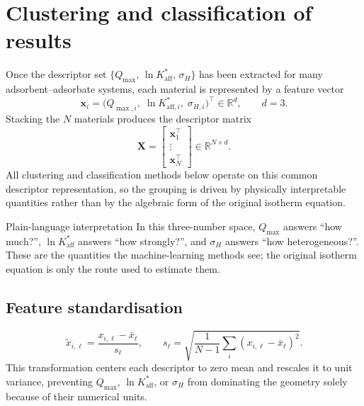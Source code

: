 \documentclass[journal=jacsat,manuscript=article]{achemso}
\begin{document}
\section{Clustering and classification of results}
\label{sec:si_clustering}

Once the descriptor set
$\{Q_{\max},\, \ln K_{\mathrm{aff}}^{\ast},\, \sigma_H\}$ has been
extracted for many adsorbent--adsorbate systems, each material is
represented by a feature vector
\begin{equation}
	\mathbf{x}_i
	=
	\bigl(
	Q_{\max,i},\;
	\ln K_{\mathrm{aff},i}^{\ast},\;
	\sigma_{H,i}
	\bigr)^\top
	\in \mathbb{R}^{d},
	\qquad d=3.
	\label{eq:si_feature_vector}
\end{equation}
Stacking the $N$ materials produces the descriptor matrix
\begin{equation}
	\mathbf{X}
	=
	\begin{bmatrix}
	\mathbf{x}_1^\top\\
	\vdots\\
	\mathbf{x}_N^\top
	\end{bmatrix}
	\in \mathbb{R}^{N\times d}.
	\label{eq:si_feature_matrix}
\end{equation}
All clustering and classification methods below operate on this common
descriptor representation, so the grouping is driven by physically
interpretable quantities rather than by the algebraic form of the
original isotherm equation.

\begin{greenbox}{Plain-language interpretation}
	In this three-number space, \(Q_{\max}\) answers ``how much?'',
	\(\ln K_{\mathrm{aff}}^{\ast}\) answers ``how strongly?'', and
	\(\sigma_H\) answers ``how heterogeneous?''. These are the quantities
	the machine-learning methods see; the original isotherm equation is
	only the route used to estimate them.
\end{greenbox}

\subsection{Feature standardisation}
\label{sec:si_standardisation}
\begin{equation}
	\tilde{x}_{i,\ell}
	= \frac{x_{i,\ell} - \bar{x}_\ell}{s_\ell},
	\qquad
	s_\ell = \sqrt{\frac{1}{N-1}\sum_{i}(x_{i,\ell} - \bar{x}_\ell)^2}.
	\label{eq:si_standardise}
\end{equation}
This transformation centers each descriptor to zero mean and rescales it
to unit variance, preventing $Q_{\max}$, $\ln K_{\mathrm{aff}}^{\ast}$,
or $\sigma_H$ from dominating the geometry solely because of their
numerical units.
\end{document}
